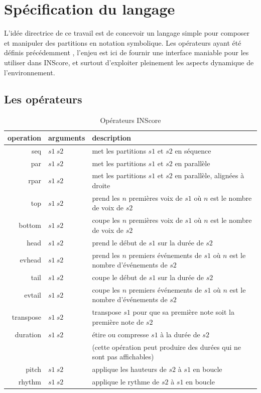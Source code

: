 \documentclass{article}
\begin{document}
\section{Spécification du langage}\label{language}

L'idée directrice de ce travail est de concevoir un langage simple pour composer et manipuler des partitions en notation symbolique. Les opérateurs ayant été définis précédemment \cite{fober12b}, l'enjeu est ici de fournir une interface maniable pour les utiliser dans INScore, et surtout d'exploiter pleinement les aspects dynamique de l'environnement.

\subsection{Les opérateurs}

\begin{table}[htdp]
\begin{center}
\begin{tabular}{rll}
\hline
operation & arguments		&	description \\
\hline
seq 	&	$s1\ s2$		& met les partitions $s1$ et $s2$ en séquence \\
par 	&	$s1\ s2$		& met les partitions $s1$ et $s2$ en parallèle \\ 
rpar	&	$s1\ s2$		& met les partitions $s1$ et $s2$ en parallèle, alignées à droite \\
top 	&	$s1\ s2$ 	& prend les $n$ premières voix de $s1$ où $n$ est le nombre de voix de $s2$ \\
bottom 	&	$s1\ s2$ 	& coupe les $n$ premières voix de $s1$ où $n$ est le nombre de voix de $s2$ \\
head	& 	$s1\ s2$	& prend le début de $s1$ sur la durée de $s2$ \\
evhead 	&	$s1\ s2$	& prend les $n$ premiers événements de $s1$ où $n$ est le nombre d'événements de $s2$ \\
tail	&	$s1\ s2$ 	& coupe le début de $s1$ sur la durée de $s2$ \\
evtail 	&	$s1\ s2$ 	& coupe les $n$ premiers événements de $s1$ où $n$ est le nombre d'événements de $s2$ \\
transpose 	&	$s1\ s2$	& transpose $s1$ pour que sa première note soit la première note de $s2$ \\
duration 	&	$s1\ s2$	& étire ou compresse $s1$ à la durée de $s2$  \\
			& 	& 	(cette opération peut produire des durées qui ne sont pas affichables) \\
pitch 	&	$s1\ s2$	& applique les hauteurs de $s2$ à $s1$ en boucle \\
rhythm 	&	$s1\ s2$	& applique le rythme de $s2$ à $s1$ en boucle \\
\hline
\end{tabular}
\end{center}

\caption{Opérateurs INScore}
\label{operations}
\end{table}
\end{document}
